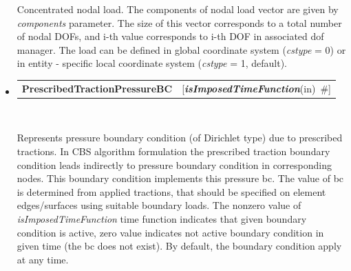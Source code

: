 \documentclass[a4paper]{article}
\makeatletter
\newcommand{\param}[1]{{\em #1}}
\newcommand{\keywordnotype}[1]{\mbox{{\it{\bf{#1}}}}}
\newcommand{\keyword}[2]{\mbox{{\keywordnotype{#1}\tiny (#2)}}}
\newcommand{\entKeywordInst}[1]{\mbox{{\bf{{#1}}}}}
\newcommand{\field}[2]{\mbox{\keyword{#1}{#2}~\#}}
\newcommand{\optField}[2]{\mbox{[\field{#1}{#2}]}}
\newenvironment{record}[1][]{\begin{tabular}{|ll}}{\end{tabular}\\}
\newcommand{\recentry}[2]{{#1}&{#2}\\}
\newcounter{rcc}
\newenvironment{record}[1][\textwidth]{\setcounter{rcc}{0}\begin{tabular*}{#1}{|ll@{\extracolsep{\fill}}r}}{\end{tabular*}\\}
\newcommand{\recentry}[2]{\ifthenelse{\value{rcc}>0}{&$\backslash$ \\}{\setcounter{rcc}{1}}{#1}&{#2}}
\makeatother
\begin{document}
\begin{itemize}
Concentrated nodal load. The components of nodal load vector
are given by \param{components} parameter. The size of this vector
corresponds to a total number of nodal DOFs, and i-th value
corresponds to i-th DOF in associated dof manager. The load can be defined in global coordinate system (\param{cstype} =
0) or in entity - specific local coordinate system
(\param{cstype} = 1, default).
\item \mbox{}

\noindent
\begin{record}[0.9\textwidth]
  \recentry{\entKeywordInst{PrescribedTractionPressureBC}}{\optField{is\-Impo\-sed\-Ti\-me\-Fun\-ction}{in}}
\end{record}

Represents pressure boundary condition (of Dirichlet type) due to
prescribed tractions.
In CBS algorithm formulation the prescribed traction
boundary condition leads indirectly to pressure boundary condition in
corresponding nodes. This boundary condition implements this pressure
bc. The value of bc is determined from applied tractions, that  should be specified on element edges/surfaces using
suitable boundary loads.
The nonzero value of \param{isImposedTimeFunction} time function
indicates that given boundary condition is active, zero value
indicates not active boundary condition in given time (the bc does not
exist). By default, the boundary condition apply at any time.
\end{itemize}
\end{document}
